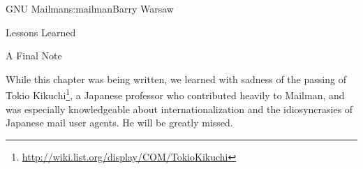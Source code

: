 \begin{aosachapter}{GNU Mailman}{s:mailman}{Barry Warsaw}
\begin{aosasect1}{Lessons Learned}
\begin{aosasect3}{A Final Note}

While this chapter was being written, we learned with
sadness of the passing of Tokio
Kikuchi\footnote{\url{http://wiki.list.org/display/COM/TokioKikuchi}},
a Japanese professor who contributed heavily to Mailman, and was
especially knowledgeable about internationalization and the
idiosyncrasies of Japanese mail user agents.  He will be greatly
missed.

\end{aosasect3}

\end{aosasect1}

\end{aosachapter}
